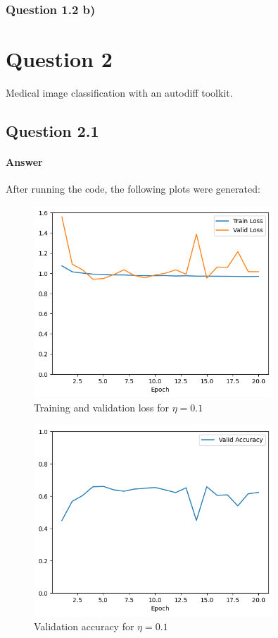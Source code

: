 \documentclass{article}
\begin{document}
\subsubsection{Question 1.2 b)}

\section{Question 2}
Medical image classification with an autodiff toolkit.

\subsection{Question 2.1}

\paragraph{Answer} After running the code, the following plots were generated:

\begin{figure}[H]
    \centering
    \includegraphics[width=0.8\textwidth]{"plots/logistic_regression-training-loss-batch-16-lr-0.1-epochs-20-l2-0-opt-sgd.png"}
    \caption{Training and validation loss for $\eta = 0.1$}
    \label{2.1 0.1 Loss Plot}
\end{figure}

\begin{figure}[H]
    \centering
    \includegraphics[width=0.8\textwidth]{"plots/logistic_regression-validation-accuracy-batch-16-lr-0.1-epochs-20-l2-0-opt-sgd.png"}
    \caption{Validation accuracy for $\eta = 0.1$}
    \label{2.1 0.1 Acc Plot}
\end{figure}
\end{document}
